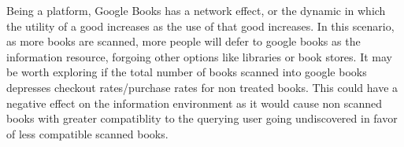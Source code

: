 \documentclass{article}
\begin{document}
Being a platform, Google Books has a network effect, or the dynamic in which the utility of a good increases as the use of that good increases. In this scenario, as more books are scanned, more people will defer to google books as the information resource, forgoing other options like libraries or book stores. It may be worth exploring if the total number of books scanned into google books depresses checkout rates/purchase rates for non treated books. This could have a negative effect on the information environment as it would cause non scanned books with greater compatiblity to the querying user going undiscovered in favor of less compatible scanned books. 

\newpage

\end{document}
